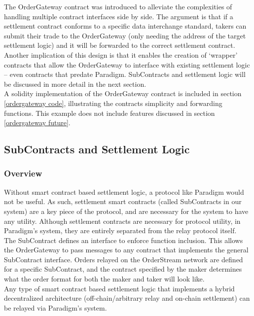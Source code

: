 \documentclass[9pt]{article}
\begin{document}
\noindent The OrderGateway contract was introduced to alleviate the complexities of handling multiple contract interfaces side by side. The argument is that if a settlement contract conforms to a specific data interchange standard, takers can submit their trade to the OrderGateway (only needing the address of the target settlement logic) and it will be forwarded to the correct settlement contract. Another implication of this design is that it enables the creation of ‘wrapper’ contracts that allow the OrderGateway to interface with existing settlement logic – even contracts that predate Paradigm. SubContracts and settlement logic will be discussed in more detail in the next section. \\

\noindent A solidity implementation of the OrderGateway contract is included in section \ref{ordergateway code}, illustrating the contracts simplicity and forwarding functions. This example does not include features discussed in section \ref{ordergateway future}.

\subsection{SubContracts and Settlement Logic}
\subsubsection{Overview}
\noindent Without smart contract based settlement logic, a protocol like Paradigm would not be useful. As such, settlement smart contracts (called SubContracts in our system) are a key piece of the protocol, and are necessary for the system to have any utility. Although settlement contracts are necessary for protocol utility, in Paradigm’s system, they are entirely separated from the relay protocol itself. \\ 

\noindent The SubContract defines an interface to enforce function inclusion. This allows the OrderGateway to pass messages to any contract that implements the general SubContract interface. Orders relayed on the OrderStream network are defined for a specific SubContract, and the contract specified by the maker determines what the order format for both the maker and taker will look like. \\ 

\noindent Any type of smart contract based settlement logic that implements a hybrid decentralized architecture (off-chain/arbitrary relay and on-chain settlement) can be relayed via Paradigm’s system. \\ 
\end{document}

